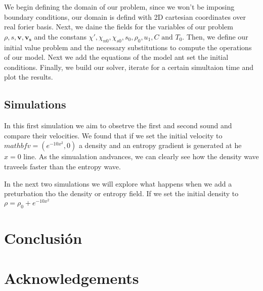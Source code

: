 \documentclass{article}
\begin{document}
We begin defining the domain of our problem, since we won't be imposing boundary conditions, our domain is defind with 2D cartesian coordinates over real forier basis.
Next, we daine the fields for the variables of our problem \(\rho, s, \mathbf{v}, \mathbf{v_s}\) and the constans \(\chi', \chi_{n0}, \chi_{s0}, s_0, \rho_0, u_1, C \text{ and } T_0\).
Then, we define our initial value problem and the necessary substitutions to compute the operations of our model.
Next we add the equations of the model ant set the initial conditions. 
Finally, we build our solver, iterate for a certain simultaion time and plot the results.

\subsection{Simulations}
In this first simulation we aim to obsetrve the first and second sound and compare their velocities.
We found that if we set the initial velocity to \(mathbf{v} = (e^{-10x^2}, 0)\) a density and an entropy gradient is generated at he \(x=0\) line. 
As the simualation andvances, we can clearly see how the density wave traveels faster than the entropy wave.

In the next two simulations we will explore what happens when we add a preturbation tho the density or entropy field.
If we set the initial density to \(\rho = \rho_0 + e^{-10x^2}\)

\section{Conclusión}


 
\section{Acknowledgements}


\

\end{document}
